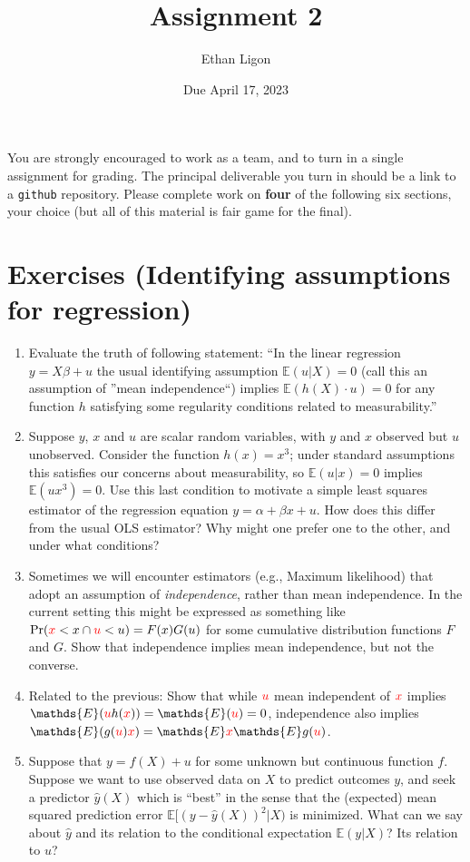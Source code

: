 \documentclass[12pt]{amsart}
\author{Ethan Ligon}
\date{Due April 17, 2023}
\title{Assignment 2}
\newcommand{\rv}[1]{\ensuremath{\textcolor{red}{#1}{}}}
\newcommand{\rvx}{\rv{x}}
\newcommand{\rvu}{\rv{u}}
\renewcommand{\E}{\ensuremath{\mathds{E}}}
\begin{document}
\maketitle
You are strongly encouraged to work as a  team, and to turn in a single assignment for grading.   The principal deliverable you turn in should be a link to a \texttt{github} repository.  Please complete work on \textbf{four} of the following six sections, your choice (but all of this material is fair game for the final).
\section{Exercises (Identifying assumptions for regression)}
\label{sec:org93a3c76}

\begin{enumerate}
\item Evaluate the truth of following statement: ``In the linear regression \(y=X\beta + u\) the usual identifying assumption \(\E(u|X)=0\) (call this an assumption of ''mean independence``) implies \(\E(h(X)\cdot u)=0\) for any function \(h\) satisfying some regularity conditions related to measurability.''

\item Suppose \(y\), \(x\) and \(u\) are scalar random variables, with \(y\) and \(x\) observed but \(u\) unobserved.  Consider the function \(h(x)=x^3\); under standard assumptions this satisfies our concerns about measurability, so \(\E(u|x)=0\) implies \(\E(ux^3)=0\).   Use this last condition to motivate a simple least squares estimator of the regression equation \(y=\alpha + \beta x + u\).  How does this differ from the usual OLS estimator?  Why might one prefer one to the other, and under what conditions?

\item Sometimes we will encounter estimators (e.g., Maximum likelihood) that adopt an assumption of \emph{independence}, rather than mean independence.  In the current setting this might be expressed as something like \(\mbox{Pr}(\rvx<x \cap \rvu<u)=F(x)G(u)\) for some cumulative distribution functions \(F\) and \(G\).  Show that independence implies mean independence, but not the converse.

\item Related to the previous: Show that while \(\rvu\) mean independent of \(\rvx\) implies \(\E(\rvu h(\rvx))=\E(\rvu)=0\), independence also implies \(\E(g(\rvu)\rvx)=\E \rvx\E g(\rvu)\).

\item Suppose that \(y=f(X)+u\) for some unknown but continuous function \(f\).  Suppose we want to use observed data on \(X\) to predict outcomes \(y\), and seek a predictor \(\hat{y}(X)\) which is ``best'' in the sense that the (expected) mean squared prediction error \(\E [(y-\hat{y}(X))^2|X)\) is minimized.  What can we say about \(\hat{y}\) and its relation to the conditional expectation \(\E(y|X)\)?  Its relation to \(u\)?


\end{enumerate}
\end{document}
